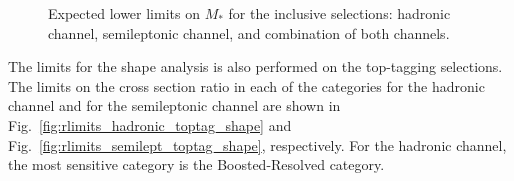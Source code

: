 \begin{figure}[htbp]
\begin{center}
  \caption{Expected lower limits on $M_*$ for the inclusive selections:  hadronic channel,  semileptonic channel, and  combination of both channels.}
  \label{fig:mstarlimits_incl_shape}
\end{center}
\end{figure}

The limits for the shape analysis is also performed on the top-tagging selections. The limits on the cross section ratio in each of the categories for the hadronic channel and for the semileptonic channel are shown in Fig.~\ref{fig:rlimits_hadronic_toptag_shape} and Fig.~\ref{fig:rlimits_semilept_toptag_shape}, respectively. For the hadronic channel, the most sensitive category is the Boosted-Resolved category.

